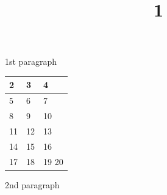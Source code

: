 \documentclass[11pt,a4paper]{article}
\title{1}
\begin{document}
\maketitle

1st paragraph

\begin{table}[h]
\begin{tabular}{|l|l|l|}
\hline
\textbf{2} & \textbf{3} & \textbf{4} \\ \hline
5 & 6 & 7 \\ \hline
8 & 9 & 10 \\ \hline
11 & 12 & 13 \\ \hline
14 & 15 & 16 \\ \hline
17 & 18 & 19  20 \\ \hline
\end{tabular}
\end{table}

2nd paragraph
\end{document}

